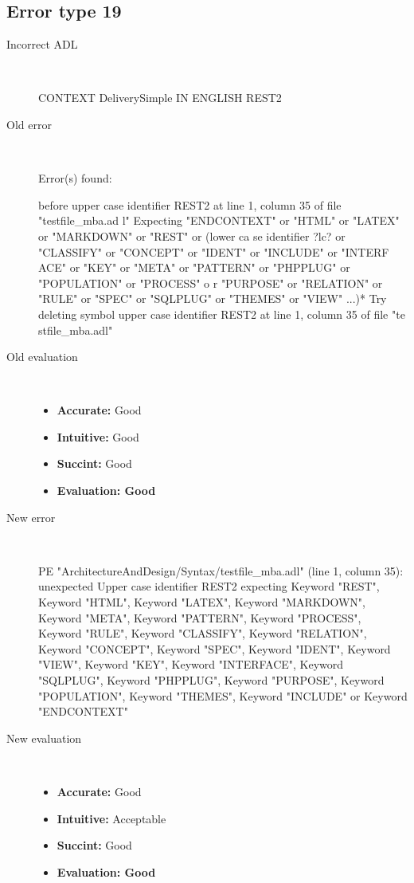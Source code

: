 \subsection{Error type 19}
  \begin{description}
  \item[Incorrect ADL]~\\
\begin{adl}
CONTEXT DeliverySimple IN ENGLISH REST2\end{adl}
  \item[Old error]~\\
\begin{haskell}
Error(s) found:

before upper case identifier REST2 at line 1, column 35 of file "testfile_mba.ad
l"
Expecting "ENDCONTEXT" or "HTML" or "LATEX" or "MARKDOWN" or "REST" or (lower ca
se identifier ?lc? or "CLASSIFY" or "CONCEPT" or "IDENT" or "INCLUDE" or "INTERF
ACE" or "KEY" or "META" or "PATTERN" or "PHPPLUG" or "POPULATION" or "PROCESS" o
r "PURPOSE" or "RELATION" or "RULE" or "SPEC" or "SQLPLUG" or "THEMES" or "VIEW"
 ...)*
Try deleting symbol upper case identifier REST2 at line 1, column 35 of file "te
stfile_mba.adl"\end{haskell}
  \item[Old evaluation]~\\
    \begin{itemize}
    \item \textbf{Accurate:} Good
    \item \textbf{Intuitive:} Good
    \item \textbf{Succint:} Good
    \item \textbf{Evaluation: Good}
    \end{itemize}
  \item[New error]~\\
\begin{haskell}
PE "ArchitectureAndDesign/Syntax/testfile_mba.adl" (line 1, column 35):
unexpected Upper case identifier REST2
expecting Keyword "REST", Keyword "HTML", Keyword "LATEX", Keyword "MARKDOWN", Keyword "META", Keyword "PATTERN", Keyword "PROCESS", Keyword "RULE", Keyword "CLASSIFY", Keyword "RELATION", Keyword "CONCEPT", Keyword "SPEC", Keyword "IDENT", Keyword "VIEW", Keyword "KEY", Keyword "INTERFACE", Keyword "SQLPLUG", Keyword "PHPPLUG", Keyword "PURPOSE", Keyword "POPULATION", Keyword "THEMES", Keyword "INCLUDE" or Keyword "ENDCONTEXT"
\end{haskell}
  \item[New evaluation]~\\
    \begin{itemize}
    \item \textbf{Accurate:} Good
    \item \textbf{Intuitive:} Acceptable
    \item \textbf{Succint:} Good
    \item \textbf{Evaluation: Good
}
    \end{itemize}
  \end{description}

